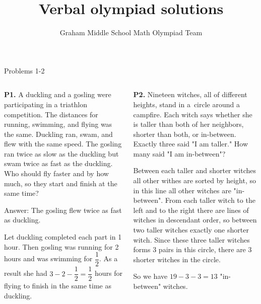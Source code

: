 \documentclass[9pt,aspectratio=169]{beamer}
\title{Verbal olympiad solutions}
\subtitle[Graham Middle School]{Graham Middle School Math Olympiad Team}
\begin{document}
\maketitle

\begin{frame}{Problems 1-2}
  \begin{columns}[T]
    \begin{column}{0.5\textwidth}
      \begin{problem}
        \textbf{P1.} A duckling and a gosling were participating in a triath\-lon competition. The
        distances for running, swimming, and flying was the same. Duckling ran, swam, and flew with the same speed. The gosling ran twice as slow as the duckling
        but swam twice as fast as the duckling. Who should fly faster and by how much, so they start and finish at the same time?
      \end{problem}

      Answer: The gosling flew twice as fast as duckling.

      Let duckling completed each part in 1 hour. Then gosling was running for 2 hours and was swimming for $\dfrac{1}{2}$. As a result she had $3 - 2 - \dfrac{1}{2} = \dfrac{1}{2}$ hours for flying to finish in the same time as duckling. 
    \end{column}
    \begin{column}{0.5\textwidth}
      \begin{problem}
        \textbf{P2.} Nineteen witches, all of different heights, stand in a~circle around a campfire.
        Each witch says whether she is taller than both of her neighbors, shorter than both,
        or in-between. Exactly three said "I am taller." How many said "I am in-between"?
      \end{problem}
      Between each taller and shorter witches all other withes are sorted by height, so in this line all other witches are "in-between". From each taller witch to the left and to the right there are lines of witches in descendant order, so between two taller witches exactly one shorter witch. Since these three taller witches forms $3$ pairs in this circle, there are $3$ shorter witches in the circle. 
      
      So we have $19 - 3 - 3 = 13$ "in-between" witches. 
    \end{column}
  \end{columns}
\end{frame}
\end{document}
